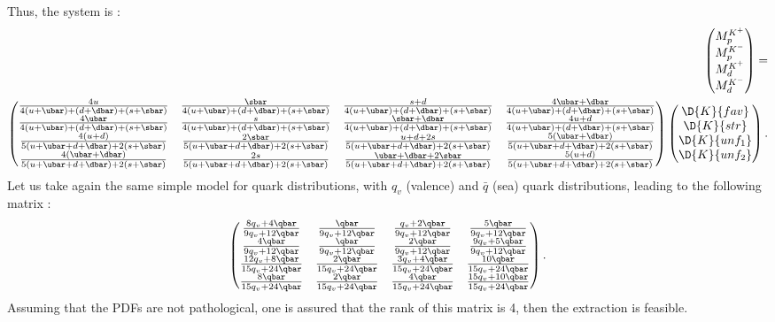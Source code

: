 Thus, the system is :
%
\begin{equation} \label{eq:mult_sys4}
  \begin{split}
  \begin{pmatrix}
    M^{K^+}_p \\
    M^{K^-}_p \\
    M^{K^+}_d \\
    M^{K^-}_d \\
  \end{pmatrix}
  = \\
  \begin{pmatrix}
    \frac{4u}{4(u+\ubar)+(d+\dbar)+(s+\sbar)} & \frac{\sbar}{4(u+\ubar)+(d+\dbar)+(s+\sbar)} & \frac{s+d}{4(u+\ubar)+(d+\dbar)+(s+\sbar)} & \frac{4\ubar+\dbar}{4(u+\ubar)+(d+\dbar)+(s+\sbar)} \\
    \frac{4\ubar}{4(u+\ubar)+(d+\dbar)+(s+\sbar)} & \frac{s}{4(u+\ubar)+(d+\dbar)+(s+\sbar)} & \frac{\sbar+\dbar}{4(u+\ubar)+(d+\dbar)+(s+\sbar)} & \frac{4u+d}{4(u+\ubar)+(d+\dbar)+(s+\sbar)} \\
    \frac{4(u+d)}{5(u+\ubar+d+\dbar)+2(s+\sbar)} & \frac{2\sbar}{5(u+\ubar+d+\dbar)+2(s+\sbar)} & \frac{u+d+2s}{5(u+\ubar+d+\dbar)+2(s+\sbar)} & \frac{5(\ubar+\dbar)}{5(u+\ubar+d+\dbar)+2(s+\sbar)} \\
    \frac{4(\ubar+\dbar)}{5(u+\ubar+d+\dbar)+2(s+\sbar)} & \frac{2s}{5(u+\ubar+d+\dbar)+2(s+\sbar)} & \frac{\ubar+\dbar+2\sbar}{5(u+\ubar+d+\dbar)+2(s+\sbar)} & \frac{5(u+d)}{5(u+\ubar+d+\dbar)+2(s+\sbar)}
  \end{pmatrix}
  \begin{pmatrix}
    \D{K}{fav} \\
    \D{K}{str} \\
    \D{K}{unf_1} \\
    \D{K}{unf_2}
  \end{pmatrix}.
\end{split}
\end{equation}
%
Let us take again the same simple model for quark distributions, with $q_v$ (valence) and $\bar{q}$ (sea) quark distributions, leading to the following matrix :
%
\begin{equation} \label{eq:mat_rank_4E}
  \begin{pmatrix}
    \frac{8q_v+4\qbar}{9q_v+12\qbar} & \frac{\qbar}{9q_v+12\qbar} & \frac{q_v+2\qbar}{9q_v+12\qbar} & \frac{5\qbar}{9q_v+12\qbar} \\
    \frac{4\qbar}{9q_v+12\qbar} & \frac{\qbar}{9q_v+12\qbar} & \frac{2\qbar}{9q_v+12\qbar} & \frac{9q_v+5\qbar}{9q_v+12\qbar} \\
    \frac{12q_v+8\qbar}{15q_v+24\qbar} & \frac{2\qbar}{15q_v+24\qbar} & \frac{3q_v+4\qbar}{15q_v+24\qbar} & \frac{10\qbar}{15q_v+24\qbar} \\
    \frac{8\qbar}{15q_v+24\qbar} & \frac{2\qbar}{15q_v+24\qbar} & \frac{4\qbar}{15q_v+24\qbar} & \frac{15q_v+10\qbar}{15q_v+24\qbar}
  \end{pmatrix}.
\end{equation}
%
Assuming that the PDFs are not pathological, one is assured that the rank of this matrix is 4, then the extraction
is feasible.

